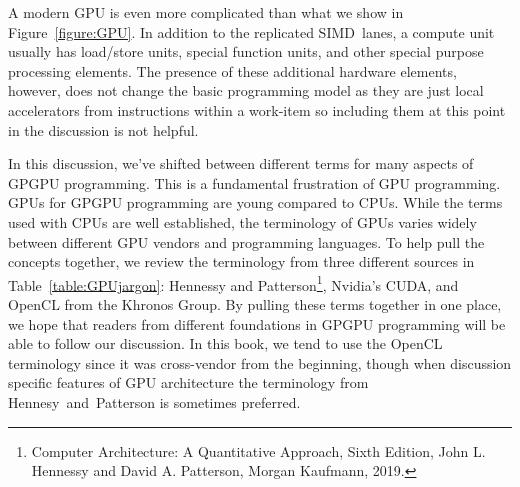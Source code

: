 A modern GPU is even more complicated than what we show in Figure~\ref{figure:GPU}.  In addition to
the replicated SIMD~lanes, a compute unit usually has load/store units, special function units, and other
special purpose processing elements.  The presence of these additional hardware elements, however,
does not change the basic programming model as they are just local accelerators from instructions within a 
work-item so including them at this point in the discussion is not helpful.

In this discussion, we've shifted between different terms for many aspects of GPGPU programming.
This is a fundamental frustration of GPU programming. 
GPUs for GPGPU programming are young compared to CPUs.  
While the terms used with CPUs are well established,
the terminology of GPUs varies widely between different GPU vendors and programming
languages.  To help pull the concepts together, we review the terminology from three
different sources in Table~\ref{table:GPUjargon}: Hennessy and 
Patterson\footnote{Computer Architecture: A Quantitative Approach, Sixth Edition, 
John L. Hennessy and David A. Patterson, Morgan Kaufmann, 2019.}, Nvidia's CUDA, 
and OpenCL from the Khronos Group.  By pulling these terms together in one place, we
hope that readers from different foundations in GPGPU programming will be able to follow 
our discussion.  In this book, we tend to use the OpenCL terminology since it was cross-vendor
from the beginning, though when discussion specific features of GPU architecture the terminology 
from Hennesy~and~Patterson is sometimes preferred.

